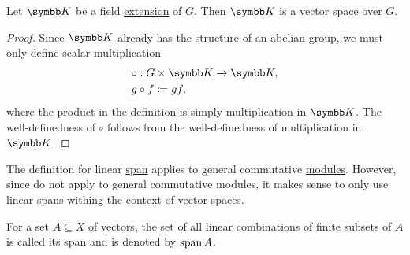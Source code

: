 \begin{proposition}\label{thm:field_extension_is_vector_space}
  Let \( \BK \) be a field \hyperref[def:field_extension]{extension} of \( G \). Then \( \BK \) is a vector space over \( G \).
\end{proposition}
\begin{proof}
  Since \( \BK \) already has the structure of an abelian group, we must only define scalar multiplication
  \begin{align*}
    &\circ: G \times \BK \to \BK, \\
    &g \circ f \coloneqq gf,
  \end{align*}
  where the product in the definition is simply multiplication in \( \BK \). The well-definedness of \( \circ \) follows from the well-definedness of multiplication in \( \BK \).
\end{proof}

\begin{remark}\label{remark:linear_span_only_for_vector_spaces}
  The definition for linear \hyperref[def:linear_span]{span} applies to general commutative \hyperref[def:left_module]{modules}. However, since  do not apply to general commutative modules, it makes sense to only use linear spans withing the context of vector spaces.
\end{remark}

\begin{definition}\label{def:linear_span}
  For a set \( A \subseteq X \) of vectors, the set of all linear combinations of finite subsets of \( A \) is called its span and is denoted by \( \operatorname{span}{A} \).
\end{definition}


